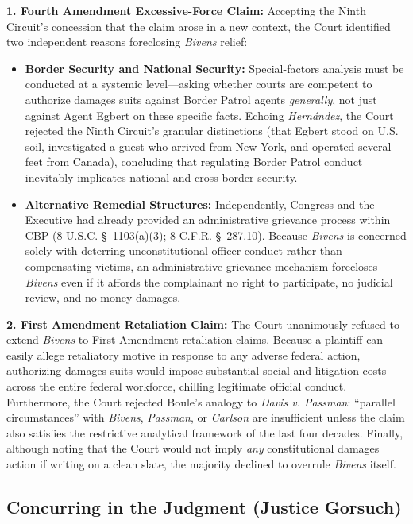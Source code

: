 \documentclass[12pt]{article}
\begin{document}
\textbf{1. Fourth Amendment Excessive-Force Claim:} Accepting the Ninth Circuit's concession that the claim arose in a new context, the Court identified two independent reasons foreclosing \textit{Bivens} relief:
\begin{itemize}
  \item \textbf{Border Security and National Security:} Special-factors analysis must be conducted at a systemic level---asking whether courts are competent to authorize damages suits against Border Patrol agents \textit{generally}, not just against Agent Egbert on these specific facts. Echoing \textit{Hern\'andez}, the Court rejected the Ninth Circuit's granular distinctions (that Egbert stood on U.S. soil, investigated a guest who arrived from New York, and operated several feet from Canada), concluding that regulating Border Patrol conduct inevitably implicates national and cross-border security.
  \item \textbf{Alternative Remedial Structures:} Independently, Congress and the Executive had already provided an administrative grievance process within CBP (8 U.S.C. \S~1103(a)(3); 8 C.F.R. \S~287.10). Because \textit{Bivens} is concerned solely with deterring unconstitutional officer conduct rather than compensating victims, an administrative grievance mechanism forecloses \textit{Bivens} even if it affords the complainant no right to participate, no judicial review, and no money damages.
\end{itemize}

\textbf{2. First Amendment Retaliation Claim:} The Court unanimously refused to extend \textit{Bivens} to First Amendment retaliation claims. Because a plaintiff can easily allege retaliatory motive in response to any adverse federal action, authorizing damages suits would impose substantial social and litigation costs across the entire federal workforce, chilling legitimate official conduct. Furthermore, the Court rejected Boule's analogy to \textit{Davis v. Passman}: ``parallel circumstances'' with \textit{Bivens}, \textit{Passman}, or \textit{Carlson} are insufficient unless the claim also satisfies the restrictive analytical framework of the last four decades. Finally, although noting that the Court would not imply \textit{any} constitutional damages action if writing on a clean slate, the majority declined to overrule \textit{Bivens} itself.

\subsection{Concurring in the Judgment (Justice Gorsuch)}
\end{document}
